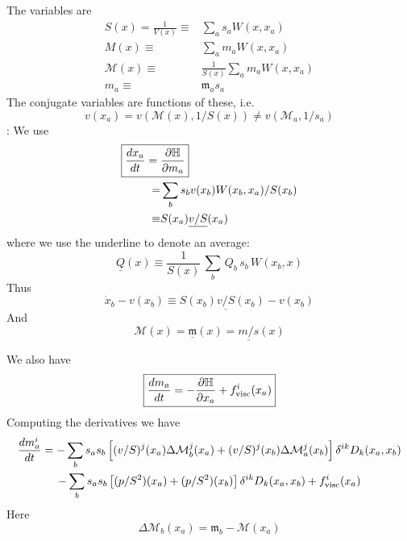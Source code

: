 \documentclass[12pt,aps,preprint,nofootinbib,noshowkeys,noshowpacs,longbibliography,superscriptaddress,tightenlines]{revtex4-2}
\def\st{\begin{equation}}
\def\stp{\end{equation}}
\def\M{{\mathcal M}}
\def\m{{\mathfrak m}}
\begin{document}
The variables are
\begin{align}
    S(x) = \frac{1}{V(x)}  \equiv& \sum_a s_a W(x, x_a) \\
    M(x) \equiv & \sum_a  m_a W(x, x_a)  \\
    \M (x)  \equiv& \frac{1}{S(x)} \sum_{a} m_a W(x, x_a)  \\
    m_a \equiv& \m_a s_a
\end{align}
The conjugate variables are functions of these, i.e. 
\st
   v(x_a) = v(\M(x), 1/S(x)) \neq v(\M_a, 1/s_a)
\stp
: 
We use 
\begin{align}
    \Aboxed{
    \frac{dx_a}{dt}  =&  \frac{\partial {\mathbb H}}{\partial m_a} }  \\
    =& \sum_b s_b v(x_b) W(x_b, x_a) /S(x_b) \\
    \equiv& S(x_a) \underline{v/S}(x_a)
\end{align}
where we use the underline to denote an average:
\st
\underline{Q}(x) \equiv \frac{1}{S(x) } \, \sum_b\,  Q_b \,  s_b \, W(x_b, x)  
\stp
Thus
\st
\dot x_b - v(x_b)  \equiv  S(x_b) \underline{v/S}(x_b) - v(x_b)
\stp
And
\st
\M(x) = \underline \m(x) = \underline{m/s}(x)
\stp


We also have
\st
\boxed{
    \frac{dm_a}{dt} =  -\frac{\partial {\mathbb H}}{\partial x_a}  +  f^{i}_{\rm visc}(x_a) 
}
\stp
Computing the derivatives we have 
\begin{multline}
    \frac{dm_{a}^i}{dt}  =  -\sum_{b} s_a s_b \left[ (v/S)^j(x_a) \Delta \M_b^j(x_a) + (v/S)^j(x_b) \Delta \M_a^j (x_b)  \right]  \delta^{ik } D_k (x_a, x_b)
    \\
    - \sum_{b} s_a s_b \left[ (p/S^2)(x_a) + (p/S^2)(x_b) \right] \delta^{ik }  D_k (x_a, x_b)
    + f_{\rm visc}^i(x_a)
\end{multline}
Here 
\st
\Delta \M_b(x_a) = \m_b - \M(x_a)
\stp
\end{document}
